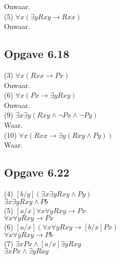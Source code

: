 \documentclass[11pt]{article}
\newcommand{\E}{\exists}
\newcommand{\A}{\forall}
\begin{document}
Onwaar. \\

(5) $\A x(\E y Rxy \rightarrow Rxx)$ \\

Onwaar. \\


\subsection*{Opgave 6.18}

(3) $\A x(Rxx \rightarrow Px)$ \\

Onwaar. \\

(6) $\A x(Px \rightarrow \E y Rxy)$ \\

Onwaar. \\

(9) $\E x \E y(Rxy \wedge \neg Px \wedge \neg Py)$ \\

Waar. \\

(10) $\A x(Rxx \rightarrow \E y(Rxy \wedge Py))$ \\

Waar. \\


\subsection*{Opgave 6.22}


(4) $[b/y](\E x \E y Rxy \wedge Py)$ \\

$\E x \E y Rxy \wedge Pb$ \\

(5) $[a/x] \A x \A y Rxy \rightarrow Px$ \\

$\A x \A y Rxy \rightarrow Px$ \\

(6) $[a/x] (\A x \A y Rxy \rightarrow [b/x]Px)$ \\

$\A x \A y Rxy \rightarrow Pb$ \\

(7) $\E x Px \wedge [a/x] \E y Rxy$ \\

$\E x Px \wedge \E y Ray$ \\
\end{document}
